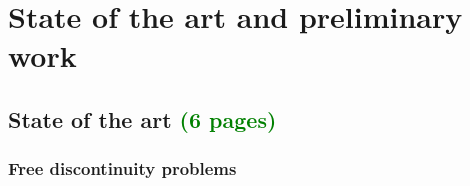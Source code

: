 \documentclass[enabledeprecatedfontcommands,cleardoublepage=empty,headsepline,twoside,11pt,DIV=15,BCOR=12mm,final]{scrartcl}
\begin{document}



\section{State of the art and preliminary work}
\label{sec:state-prelim}

\subsection{State of the art \textcolor{green}{(6 pages)}}
\label{sec:state} 

\subsubsection{Free discontinuity problems}
\end{document}
